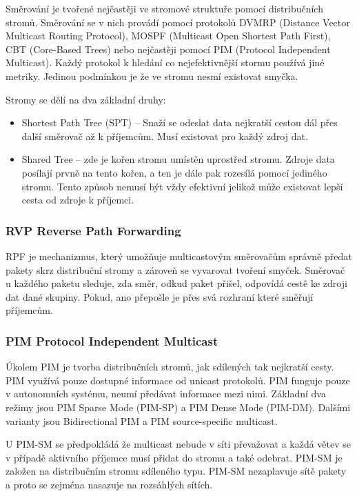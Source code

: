Směrování je tvořené nejčastěji ve stromové struktuře pomocí distribučních stromů.
Směrování se v nich provádí pomocí protokolů DVMRP (Distance Vector Multicast Routing Protocol), MOSPF (Multicast Open Shortest Path First), CBT (Core-Based Trees) nebo nejčastěji pomocí PIM (Protocol Independent Multicast).
Každý protokol k hledání co nejefektivnější stormu používá jiné metriky.
Jedinou podmínkou je že ve stromu nesmí existovat smyčka.

Stromy se dělí na dva základní druhy:

\begin{itemize}[noitemsep]
    \item Shortest Path Tree (SPT) -- Snaží se odeslat data nejkratší cestou dál přes další směrovač až k příjemcům.
    Musí existovat pro každý zdroj dat.
    \item Shared Tree -- zde je kořen stromu umístěn uprostřed stromu.
    Zdroje data posílají prvně na tento kořen, a ten je dále pak rozesílá pomocí jediného stromu.
    Tento způsob nemusí být vždy efektivní jelikož může existovat lepší cesta od zdroje k příjemci.
\end{itemize}

\subsubsection{RVP Reverse Path Forwarding}

RPF je mechanizmus, který umožňuje multicastovým směrovačům správně předat pakety skrz distribuční stromy a zároveň se vyvarovat tvoření smyček.
Směrovač u každého paketu sleduje, zda směr, odkud paket přišel, odpovídá cestě ke zdroji dat dané skupiny.
Pokud, ano přepošle je přes svá rozhraní které směřují příjemcům.

\subsubsection{PIM Protocol Independent Multicast}

Úkolem PIM je tvorba distribučních stromů, jak sdílených tak nejkratší cesty.
PIM využívá pouze dostupné informace od unicast protokolů.
PIM funguje pouze v autonomních systému, neumí předávat informace mezi nimi.
Základní dva režimy jsou PIM Sparse Mode (PIM-SP) a PIM Dense Mode (PIM-DM). Dalšími varianty jsou Bidirectional PIM a PIM source-specific multicast.

U PIM-SM se předpokládá že multicast nebude v síti převažovat a každá větev se v případě aktivního příjemce musí přidat do stromu a také odebrat.
PIM-SM je založen na distribučním stromu sdíleného typu.
PIM-SM nezaplavuje sítě pakety a proto se zejména nasazuje na rozsáhlých sítích.


